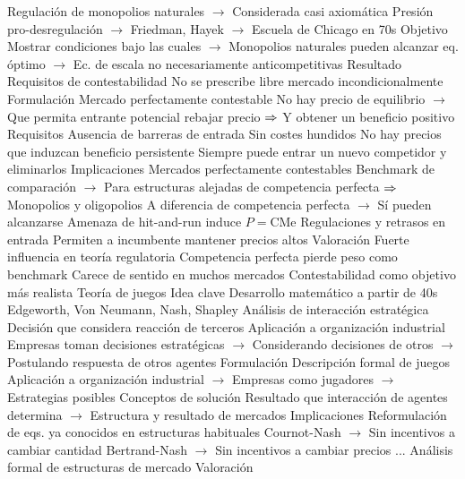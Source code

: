 \documentclass{nuevotema}
\begin{document}
\begin{esquemal}
				\4[] Regulación de monopolios naturales
				\4[] $\to$ Considerada casi axiomática
				\4[] Presión pro-desregulación
				\4[] $\to$ Friedman, Hayek
				\4[] $\to$ Escuela de Chicago en 70s
				\4 Objetivo
				\4[] Mostrar condiciones bajo las cuales
				\4[] $\to$ Monopolios naturales pueden alcanzar eq. óptimo
				\4[] $\to$ Ec. de escala no necesariamente anticompetitivas
				\4 Resultado
				\4[] Requisitos de contestabilidad
				\4[] No se prescribe libre mercado incondicionalmente
			\3 Formulación
				\4 Mercado perfectamente contestable
				\4[] No hay precio de equilibrio
				\4[] $\to$ Que permita entrante potencial rebajar precio
				\4[] $\then$ Y obtener un beneficio positivo
				\4 Requisitos
				\4[] Ausencia de barreras de entrada
				\4[] Sin costes hundidos
				\4[$\then$] No hay precios que induzcan beneficio persistente
				\4[] Siempre puede entrar un nuevo competidor y eliminarlos
			\3 Implicaciones
				\4 Mercados perfectamente contestables
				\4[] Benchmark de comparación
				\4[] $\to$ Para estructuras alejadas de competencia perfecta
				\4[] $\then$ Monopolios y oligopolios
				\4[] A diferencia de competencia perfecta
				\4[] $\to$ Sí pueden alcanzarse
				\4 Amenaza de hit-and-run induce $P=\text{CMe}$
				\4 Regulaciones y retrasos en entrada
				\4[] Permiten a incumbente mantener precios altos
			\3 Valoración
				\4 Fuerte influencia en teoría regulatoria
				\4 Competencia perfecta pierde peso como benchmark
				\4[] Carece de sentido en muchos mercados
				\4 Contestabilidad como objetivo más realista
		\2 Teoría de juegos
			\3 Idea clave
				\4 Desarrollo matemático a partir de 40s
				\4 Edgeworth, Von Neumann, Nash, Shapley
				\4 Análisis de interacción estratégica
				\4[] Decisión que considera reacción de terceros
				\4 Aplicación a organización industrial
				\4[] Empresas toman decisiones estratégicas
				\4[] $\to$ Considerando decisiones de otros
				\4[] $\to$ Postulando respuesta de otros agentes
			\3 Formulación
				\4 Descripción formal de juegos
				\4[] Aplicación a organización industrial
				\4[] $\to$ Empresas como jugadores
				\4[] $\to$ Estrategias posibles
				\4 Conceptos de solución
				\4[] Resultado que interacción de agentes determina
				\4[] $\to$ Estructura y resultado de mercados
			\3 Implicaciones
				\4 Reformulación de eqs. ya conocidos en estructuras habituales
				\4[] Cournot-Nash
				\4[] $\to$ Sin incentivos a cambiar cantidad
				\4[] Bertrand-Nash
				\4[] $\to$ Sin incentivos a cambiar precios
				\4[] ...
				\4 Análisis formal de estructuras de mercado
			\3 Valoración

\end{esquemal}
\end{document}
